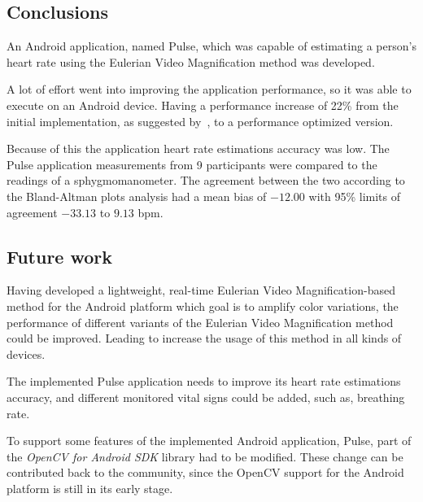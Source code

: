 \documentclass[9pt,a4paper]{extarticle}
\newcommand{\evm}{Eulerian Video Magnification}
\begin{document}
\begin{multicols}{2}
\section{Conclusions}\label{sec:conclusions}

An Android application, named Pulse, which was capable
of estimating a person's heart rate using the \evm{} method was developed.

A lot of effort went into improving the application performance,
so it was able to execute on an Android device. Having a performance
increase of 22\% from the initial implementation, as suggested
by~\cite{Wu2012Eulerian}, to a performance optimized version.

Because of this the application heart rate estimations accuracy was low.
The Pulse application measurements from 9 participants were compared
to the readings of a sphygmomanometer. The agreement between the two
according to the Bland-Altman plots analysis had a mean bias of $-12.00$ with
95\% limits of agreement $-33.13$ to $9.13$ bpm.

\subsection{Future work}\label{sec:future}

Having developed a lightweight, real-time \evm{}-based method for the
Android platform which goal is to amplify color variations, the performance
of different variants of the \evm{} method could be improved. Leading
to increase the usage of this method in all kinds of devices.

The implemented Pulse application needs to improve its heart rate estimations
accuracy, and different monitored vital signs could be added, such as,
breathing rate.

To support some features of the implemented Android application, Pulse,
part of the \emph{OpenCV for Android SDK} library had to be modified. These
change can be contributed back to the community, since the OpenCV support
for the Android platform is still in its early stage.



\end{multicols}
\end{document}
